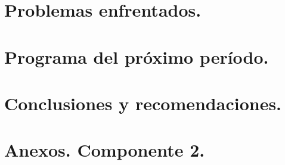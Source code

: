 \documentclass[]{article}
\begin{document}
\clearpage
\section{Problemas enfrentados.}

\clearpage
\section{Programa del próximo período.}

\clearpage
\section{Conclusiones y recomendaciones.}

\clearpage
\section{Anexos. Componente 2.}
\end{document}
